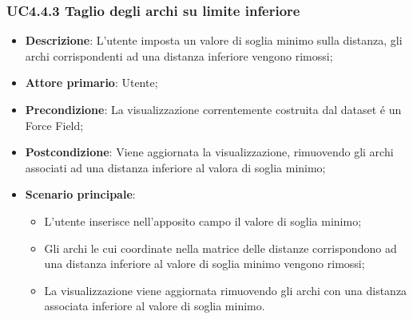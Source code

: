 \subsubsection{UC4.4.3 Taglio degli archi su limite inferiore}
\label{ssub:uc4.4.3}
\begin{itemize}
    \item \textbf{Descrizione}:     L'utente imposta un valore di soglia minimo sulla distanza, gli archi corrispondenti ad una distanza inferiore vengono rimossi;
    \item \textbf{Attore primario}: Utente;
    \item \textbf{Precondizione}:   La visualizzazione correntemente costruita dal dataset é un Force Field;
    \item \textbf{Postcondizione}:  Viene aggiornata la visualizzazione, rimuovendo gli archi associati ad una distanza inferiore al valora di soglia minimo;
    \item \textbf{Scenario principale}:
    \begin{itemize}
        \item L'utente inserisce nell'apposito campo il valore di soglia minimo;
        \item Gli archi le cui coordinate nella matrice delle distanze corrispondono ad una distanza inferiore al valore di soglia minimo vengono rimossi;
        \item La visualizzazione viene aggiornata rimuovendo gli archi con una distanza associata inferiore al valore di soglia minimo.
    \end{itemize}
\end{itemize}

